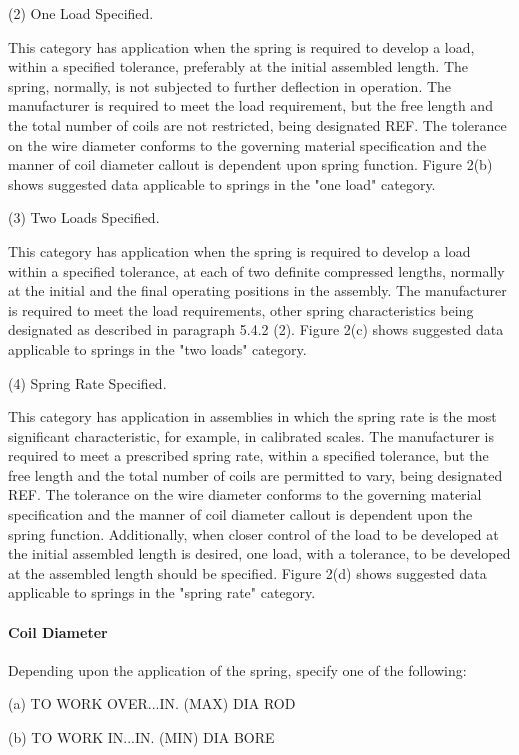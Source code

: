 \documentclass[10pt]{article}
\begin{document}
(2) One Load Specified.

This category has application when the spring is required to develop a load, within a specified tolerance, preferably at the initial assembled length.
The spring, normally, is not subjected to further deflection in operation. 
The manufacturer is required to meet the load requirement, but the free length and the total number of coils are not restricted, being designated REF. 
The tolerance on the wire diameter conforms to the governing material specification and the manner of coil diameter callout is dependent upon spring function. 
Figure 2(b) shows suggested data applicable to springs in the "one load" category.

(3) Two Loads Specified. 

This category has application when the spring is required to develop a load within a specified tolerance, at each of two definite compressed lengths, normally at the initial and the final operating positions in the assembly. 
The manufacturer is required to meet the load requirements, other spring characteristics being designated as described in paragraph 5.4.2 (2). 
Figure 2(c) shows suggested data applicable to springs in the "two loads" category.

(4) Spring Rate Specified. 

This category has application in assemblies in which the spring rate is the most significant characteristic, for example, in calibrated scales. 
The manufacturer is required to meet a prescribed spring rate, within a specified tolerance, but the free length and the total number of coils are permitted to vary, being designated REF. 
The tolerance on the wire diameter conforms to the governing material specification and the manner of coil diameter callout is dependent upon the spring function. 
Additionally, when closer control of the load to be developed at the initial assembled length is desired, one load, with a tolerance, to be developed at the assembled length should be specified. 
Figure 2(d) shows suggested data applicable to springs in the "spring rate" category.

\paragraph{Coil Diameter}
Depending upon the application of the spring, specify one of the
following:

(a) TO WORK OVER...IN. (MAX) DIA ROD

(b) TO WORK IN...IN. (MIN) DIA BORE
\end{document}
